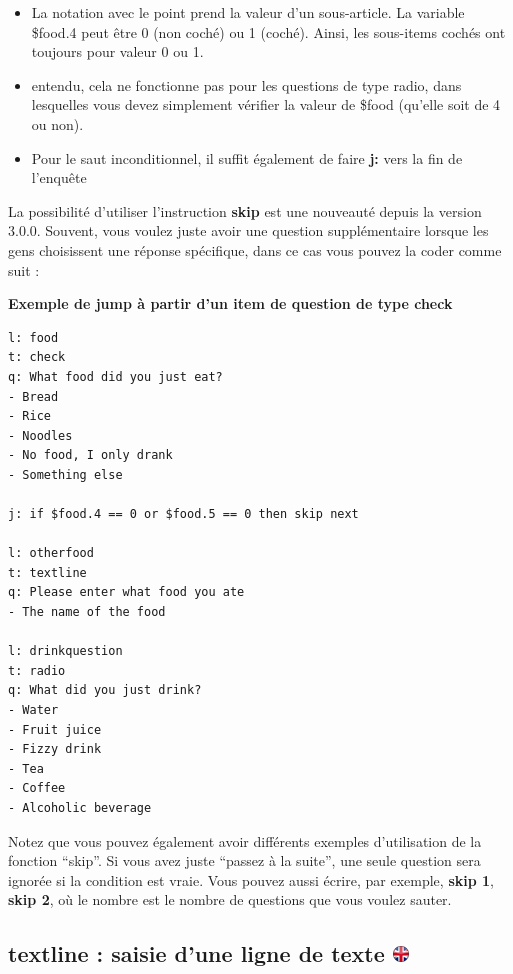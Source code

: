 \documentclass[
]{book}
\providecommand{\tightlist}{%
  \setlength{\itemsep}{0pt}\setlength{\parskip}{0pt}}
\begin{document}
\begin{itemize}
\tightlist
\item
  La notation avec le point prend la valeur d'un sous-article. La variable \$food.4 peut être 0 (non coché) ou 1 (coché). Ainsi, les sous-items cochés ont toujours pour valeur 0 ou 1.
\item
  entendu, cela ne fonctionne pas pour les questions de type radio, dans lesquelles vous devez simplement vérifier la valeur de \$food (qu'elle soit de 4 ou non).
\item
  Pour le saut inconditionnel, il suffit également de faire \textbf{j:} vers la fin de l'enquête
\end{itemize}

La possibilité d'utiliser l'instruction \textbf{skip} est une nouveauté depuis la version 3.0.0. Souvent, vous voulez juste avoir une question supplémentaire lorsque les gens choisissent une réponse spécifique, dans ce cas vous pouvez la coder comme suit :

\textbf{Exemple de jump à partir d'un item de question de type check}

\begin{verbatim}
l: food
t: check
q: What food did you just eat?
- Bread
- Rice
- Noodles
- No food, I only drank
- Something else

j: if $food.4 == 0 or $food.5 == 0 then skip next

l: otherfood
t: textline
q: Please enter what food you ate
- The name of the food

l: drinkquestion
t: radio
q: What did you just drink?
- Water
- Fruit juice
- Fizzy drink
- Tea
- Coffee
- Alcoholic beverage
\end{verbatim}

Notez que vous pouvez également avoir différents exemples d'utilisation de la fonction ``skip''. Si vous avez juste ``passez à la suite'', une seule question sera ignorée si la condition est vraie. Vous pouvez aussi écrire, par exemple, \textbf{skip 1}, \textbf{skip 2}, où le nombre est le nombre de questions que vous voulez sauter.

\hypertarget{textline-saisie-dune-ligne-de-texte}{%
\subsection[textline : saisie d'une ligne de texte ]{\texorpdfstring{textline : saisie d'une ligne de texte \href{https://www.psytoolkit.org/doc3.4.0/online-survey-syntax.html\#textline}{\protect\includegraphics{img/ukflag.png}}}{textline : saisie d'une ligne de texte }}\label{textline-saisie-dune-ligne-de-texte}}
\end{document}
